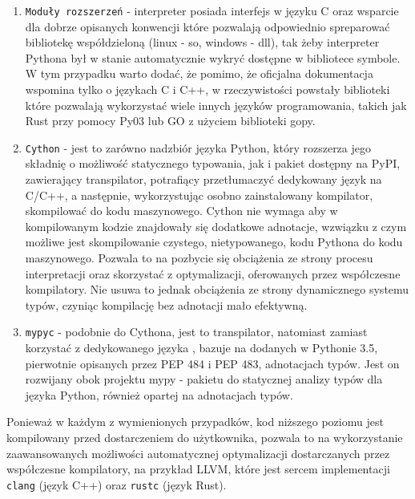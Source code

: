 \documentclass[12pt, a4paper]{article}
\newcommand{\code}[1]{\texttt{#1}}
\begin{document}
\begin{sloppypar}
\begin{enumerate}
      \item \code{Moduły rozszerzeń}\cite{Extending_Python_With_C_Cpp} - interpreter posiada
        interfejs w języku C oraz wsparcie dla dobrze opisanych konwencji które pozwalają
        odpowiednio spreparować bibliotekę współdzieloną (linux - so, windows - dll), tak
        żeby interpreter Pythona był w stanie automatycznie wykryć dostępne w bibliotece
        symbole. W tym przypadku warto dodać, że pomimo, że oficjalna dokumentacja
        wspomina tylko o językach C i C++, w rzeczywistości powstały biblioteki które pozwalają
        wykorzystać wiele innych języków programowania, takich jak Rust przy pomocy Py03\cite{PyO3}
        lub GO z użyciem biblioteki gopy\cite{gopy}.

      \item \code{Cython}\cite{Cython_Org}\cite{Cython_The_Best_Of_Both} - jest to
        zarówno nadzbiór języka Python, który rozszerza jego składnię o możliwość statycznego
        typowania, jak i pakiet dostępny na PyPI, zawierający transpilator, potrafiący
        przetłumaczyć dedykowany język na C/C++, a następnie, wykorzystując osobno
        zainstalowany kompilator, skompilować do kodu maszynowego. Cython nie wymaga aby
        w kompilowanym kodzie znajdowały się dodatkowe adnotacje, wzwiązku z czym możliwe
        jest skompilowanie czystego, nietypowanego, kodu Pythona do kodu maszynowego.
        Pozwala to na pozbycie się obciążenia ze strony procesu interpretacji oraz
        skorzystać z optymalizacji, oferowanych przez współczesne kompilatory. Nie usuwa
        to jednak obciążenia ze strony dynamicznego systemu typów, czyniąc kompilację bez
        adnotacji mało efektywną.

      \item \code{mypyc}\cite{mypyc} - podobnie do Cythona, jest to transpilator, natomiast
        zamiast korzystać z dedykowanego języka , bazuje na dodanych w Pythonie 3.5\cite{Python_3_5},
        pierwotnie opisanych przez PEP 484\cite{PEP_484} i PEP 483\cite{PEP_483},
        adnotacjach typów. Jest on rozwijany obok projektu mypy - pakietu do statycznej analizy
        typów dla języka Python, również opartej na adnotacjach typów\cite{mypy}.
    \end{enumerate}

    Ponieważ w każdym z wymienionych przypadków, kod niższego poziomu jest kompilowany przed
    dostarczeniem do użytkownika, pozwala to na wykorzystanie zaawansowanych możliwości
    automatycznej optymalizacji dostarczanych przez współczesne kompilatory, na przykład
    LLVM, które jest sercem implementacji \code{clang} (język C++) oraz \code{rustc} (język
    Rust).


\end{sloppypar}
\end{document}
